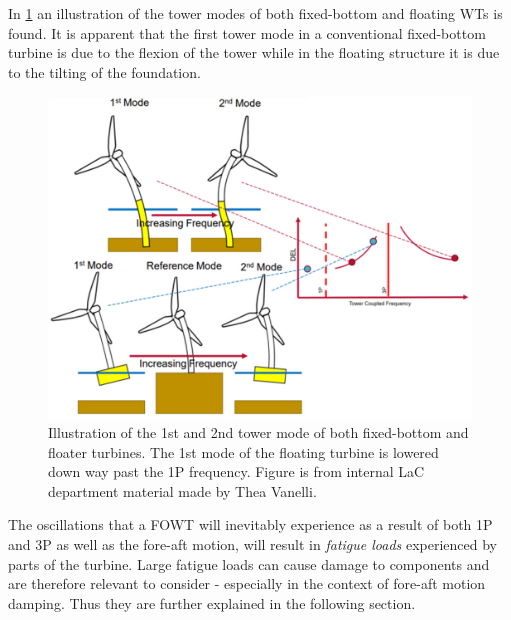 \newpage
In \cref{fig:eigen_and_1p3p} an illustration of the tower modes of both fixed-bottom and floating WTs is found. It is apparent that the first tower mode in a conventional fixed-bottom turbine is due to the flexion of the tower while in the floating structure it is due to the tilting of the foundation.
\begin{figure}[ht]
	\centering
	\includegraphics[width=0.6\linewidth]{Graphics/1P3PandEigenFloater.png}
	\caption{Illustration of the 1st and 2nd tower mode of both fixed-bottom and floater turbines. The 1st mode of the floating turbine is lowered down way past the 1P frequency. Figure is from internal LaC department material made by Thea Vanelli.}
	\label{fig:eigen_and_1p3p}
\end{figure}
The oscillations that a FOWT will inevitably experience as a result of both 1P and 3P as well as the fore-aft motion, will result in \textit{fatigue loads} experienced by parts of the turbine. Large fatigue loads can cause damage to components and are therefore relevant to consider - especially in the context of fore-aft motion damping. Thus they are further explained in the following section.


\newpage
